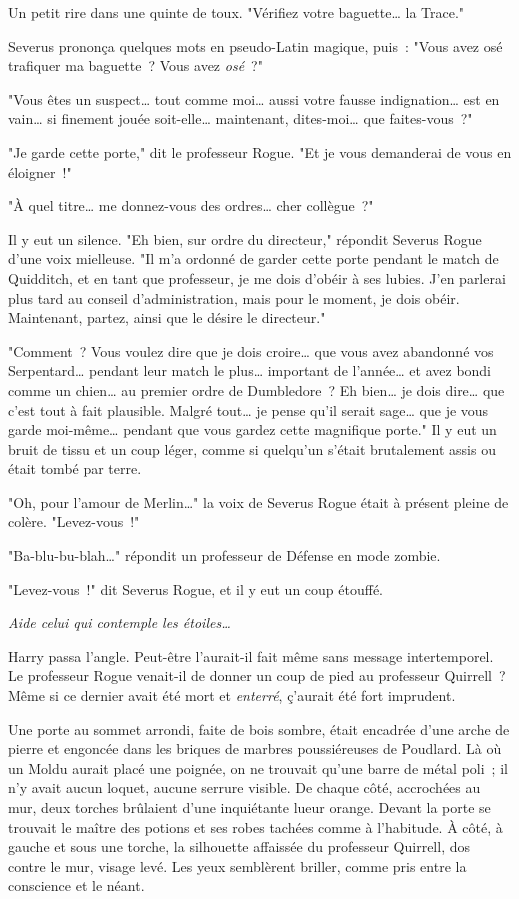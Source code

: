 Un petit rire dans une quinte de toux. "Vérifiez votre baguette… la Trace."

Severus prononça quelques mots en pseudo-Latin magique, puis~: "Vous avez osé trafiquer ma baguette~? Vous avez \emph{osé}~?"

"Vous êtes un suspect… tout comme moi… aussi votre fausse indignation… est en vain… si finement jouée soit-elle… maintenant, dites-moi… que faites-vous~?"

"Je garde cette porte," dit le professeur Rogue. "Et je vous demanderai de vous en éloigner~!"

"À quel titre… me donnez-vous des ordres… cher collègue~?"

Il y eut un silence. "Eh bien, sur ordre du directeur," répondit Severus Rogue d'une voix mielleuse. "Il m'a ordonné de garder cette porte pendant le match de Quidditch, et en tant que professeur, je me dois d'obéir à ses lubies. J'en parlerai plus tard au conseil d'administration, mais pour le moment, je dois obéir. Maintenant, partez, ainsi que le désire le directeur."

"Comment~? Vous voulez dire que je dois croire… que vous avez abandonné vos Serpentard… pendant leur match le plus… important de l'année… et avez bondi comme un chien… au premier ordre de Dumbledore~? Eh bien… je dois dire… que c'est tout à fait plausible. Malgré tout… je pense qu'il serait sage… que je vous garde moi-même… pendant que vous gardez cette magnifique porte." Il y eut un bruit de tissu et un coup léger, comme si quelqu'un s'était brutalement assis ou était tombé par terre.

"Oh, pour l'amour de Merlin…" la voix de Severus Rogue était à présent pleine de colère. "Levez-vous~!"

"Ba-blu-bu-blah…" répondit un professeur de Défense en mode zombie.

"Levez-vous~!" dit Severus Rogue, et il y eut un coup étouffé.

\emph{Aide celui qui contemple les étoiles…}

Harry passa l'angle. Peut-être l'aurait-il fait même sans message intertemporel. Le professeur Rogue venait-il de donner un coup de pied au professeur Quirrell~? Même si ce dernier avait été mort et \emph{enterré}, ç'aurait été fort imprudent.

Une porte au sommet arrondi, faite de bois sombre, était encadrée d'une arche de pierre et engoncée dans les briques de marbres poussiéreuses de Poudlard. Là où un Moldu aurait placé une poignée, on ne trouvait qu'une barre de métal poli~; il n'y avait aucun loquet, aucune serrure visible. De chaque côté, accrochées au mur, deux torches brûlaient d'une inquiétante lueur orange. Devant la porte se trouvait le maître des potions et ses robes tachées comme à l'habitude. À côté, à gauche et sous une torche, la silhouette affaissée du professeur Quirrell, dos contre le mur, visage levé. Les yeux semblèrent briller, comme pris entre la conscience et le néant.

